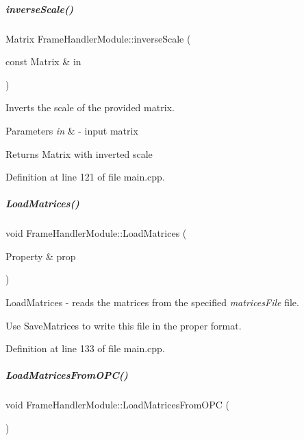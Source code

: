 \mbox{\label{group__referenceFrameHandler_ae12d6eba8c62178508bf5ac1a9977bd0}} 
\subparagraph{\texorpdfstring{inverse\+Scale()}{inverseScale()}}
{\footnotesize\ttfamily Matrix Frame\+Handler\+Module\+::inverse\+Scale (\begin{DoxyParamCaption}\item[{const Matrix \&}]{in }\end{DoxyParamCaption})\hspace{0.3cm}{\ttfamily [inline]}}



Inverts the scale of the provided matrix. 


\begin{DoxyParams}{Parameters}
{\em in} & -\/ input matrix \\
\hline
\end{DoxyParams}
\begin{DoxyReturn}{Returns}
Matrix with inverted scale 
\end{DoxyReturn}


Definition at line 121 of file main.\+cpp.

\mbox{\label{group__referenceFrameHandler_ac8865a00c58af255bafebb1ed7c525e8}} 
\subparagraph{\texorpdfstring{Load\+Matrices()}{LoadMatrices()}}
{\footnotesize\ttfamily void Frame\+Handler\+Module\+::\+Load\+Matrices (\begin{DoxyParamCaption}\item[{Property \&}]{prop }\end{DoxyParamCaption})\hspace{0.3cm}{\ttfamily [inline]}}



Load\+Matrices -\/ reads the matrices from the specified {\itshape matrices\+File} file. 

Use {\ttfamily Save\+Matrices} to write this file in the proper format. 

Definition at line 133 of file main.\+cpp.

\mbox{\label{group__referenceFrameHandler_a6ec74667ad1c117e815d31b30696261b}} 
\subparagraph{\texorpdfstring{Load\+Matrices\+From\+O\+P\+C()}{LoadMatricesFromOPC()}}
{\footnotesize\ttfamily void Frame\+Handler\+Module\+::\+Load\+Matrices\+From\+O\+PC (\begin{DoxyParamCaption}{ }\end{DoxyParamCaption})\hspace{0.3cm}{\ttfamily [inline]}}



